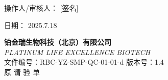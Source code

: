 \documentclass[UTF8,10pt,a4paper,fontset=fandol]{ctexart}
\newcommand{\fieldvalue}[1]{#1}
\newcommand{\handwritten}[1]{#1}
\begin{document}
\vfill

\noindent 操作人/审核人：
\fieldvalue{\handwritten{[签名]}}

\hfill
日期：
\fieldvalue{\handwritten{2025.7.18}}

\newpage

\begin{center}
\textbf{铂金瑞生物科技（北京）有限公司}\\
\textit{PLATINUM LIFE EXCELLENCE BIOTECH}\\[0.5em]
{\Large 文件编号：RBC-YZ-SMP-QC-01-01-d \qquad 版本号：1.4}\\
{\LARGE 原 \quad 请 \quad 验 \quad 单}
\end{center}
\end{document}
